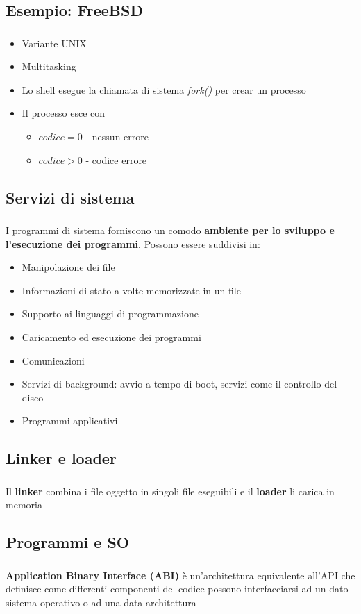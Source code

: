 \documentclass{beamer}
\newenvironment{mainframe}{
	\begin{frame}
		\frametitle{\insertsubsection}
		\framesubtitle{\insertsection}
	}{
	\end{frame}
}
\begin{document}
\subsection{Esempio: FreeBSD}
\begin{mainframe}
	\begin{itemize}
		\item Variante UNIX
		\item Multitasking
		\item Lo shell esegue la chiamata di sistema \textit{fork()} per crear un processo
		\item Il processo esce con
		\begin{itemize}
			\item $codice = 0$ - nessun errore
			\item $codice > 0$ - codice errore
		\end{itemize}
	\end{itemize}
\end{mainframe}
\subsection{Servizi di sistema}
\begin{mainframe}
	I programmi di sistema forniscono un comodo \textbf{ambiente per lo sviluppo e l'esecuzione dei programmi}. Possono essere suddivisi in:
	\begin{itemize}
		\item Manipolazione dei file
		\item Informazioni di stato a volte memorizzate in un file
		\item Supporto ai linguaggi di programmazione
		\item Caricamento ed esecuzione dei programmi
		\item Comunicazioni
		\item Servizi di background: avvio a tempo di boot, servizi come il controllo del disco
		\item Programmi applicativi
	\end{itemize}
\end{mainframe}
\subsection{Linker e loader}
\begin{mainframe}
	Il \textbf{linker} combina i file oggetto in singoli file eseguibili e il \textbf{loader} li carica in memoria
\end{mainframe}
\subsection{Programmi e SO}
\begin{mainframe}
	\textbf{Application Binary Interface (ABI)} è un'architettura equivalente all'API che definisce come differenti componenti del codice possono interfacciarsi ad un dato sistema operativo o ad una data architettura
\end{mainframe}
\end{document}
